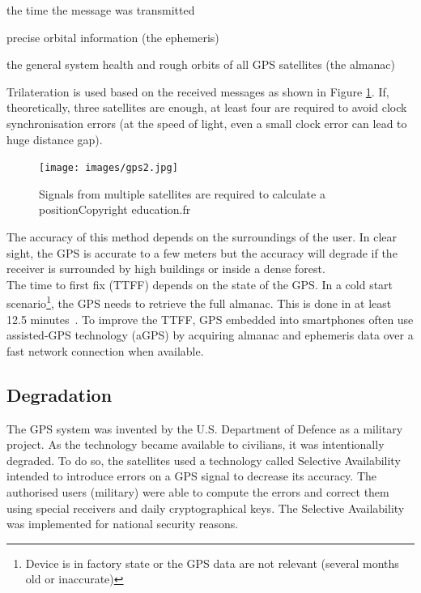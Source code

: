 \begin{itemizealt}
\item the time the message was transmitted
\item precise orbital information (the ephemeris)
\item the general system health and rough orbits of all GPS satellites (the almanac)
\end{itemizealt}

Trilateration is used based on the received messages as shown in Figure \ref{fig:gps-earth}.
If, theoretically, three satellites are enough, at least four are required to avoid clock synchronisation errors (at the speed of light, even a small clock error can lead to huge distance gap).\\

\begin{figure}[h]
  \centering
  \texttt{[image: images/gps2.jpg]}
  \caption{Signals from multiple satellites are required to calculate a position\newline Copyright education.fr}
  \label{fig:gps-earth}
\end{figure}


The accuracy of this method depends on the surroundings of the user.
In clear sight, the GPS is accurate to a few meters but the accuracy will degrade if the receiver is surrounded by high buildings or inside a dense forest.\\

The time to first fix (TTFF) depends on the state of the GPS.
In a cold start scenario\footnote{Device is in factory state or the GPS data are not relevant (several months old or inaccurate)}, the GPS needs to retrieve the full almanac.
This is done in at least 12.5 minutes~\cite{gpsuser}.
To improve the TTFF, GPS embedded into smartphones often use assisted-GPS technology (aGPS) by acquiring almanac and ephemeris data over a fast network connection when available.

\subsection{Degradation}

The GPS system was invented by the U.S. Department of Defence as a military project.
As the technology became available to civilians, it was intentionally degraded.
To do so, the satellites used a technology called Selective Availability intended to introduce errors on a GPS signal to decrease its accuracy.
The authorised users (military) were able to compute the errors and correct them using special receivers and daily cryptographical keys.
The Selective Availability was implemented for national security reasons.\\

